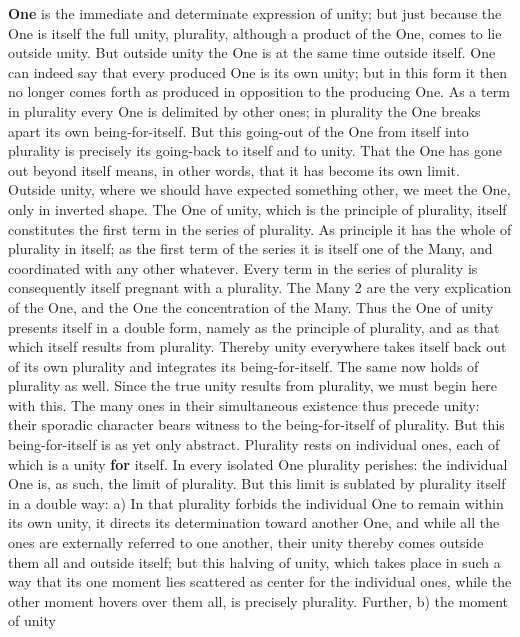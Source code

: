 \documentclass[12pt,a4paper,openany]{book}
\newcommand{\opage}[1]{\marginnote{\footnotesize\textit{[#1]}}}
\begin{document}
\textbf{One} is the immediate and determinate expression of unity;
but just because the One is itself the full unity,
plurality, although a product of the One, comes to lie outside
unity. But outside unity the One is at the same time
outside itself. One can indeed say that every produced
One is its own unity; but in this form
it then no longer comes forth as produced in opposition
to the producing One. As a term in plurality
every One is delimited by other ones; in
plurality the One breaks apart its own being-for-itself.
But this going-out of the One from itself into plurality
is precisely its going-back to itself and to unity. That the One has gone out beyond itself means, in other
words, that it has become its own limit.
Outside unity, where we should have expected something
other, we meet the One, only in inverted shape. The One
of unity, which is the principle of plurality, itself constitutes
the first term in the series of plurality. As principle
it has the whole of plurality in itself; as the first term of the series
it is itself one of the Many, and coordinated with any other
whatever. Every term in the series of plurality
is consequently itself pregnant with a plurality. The Many
\setcounter{footnote}{0}%
\opage{18}2 are the very explication of the One, and the One the concentration
of the Many. Thus the One of unity presents itself
in a double form, namely as the principle of plurality,
and as that which itself results from plurality. Thereby
unity everywhere takes itself back out of its own
plurality and integrates its being-for-itself. The same now holds of plurality as well. Since
the true unity results from plurality, we must
begin here with this. The many ones in their simultaneous existence thus precede unity: their
sporadic character bears witness to the being-for-itself of plurality. But this being-for-itself is as yet only
abstract. Plurality rests on individual ones,
each of which is a unity \textbf{for} itself. In every isolated
One plurality perishes: the individual One is, as
such, the limit of plurality. But this limit
is sublated by plurality itself in a double way: a) In that
plurality forbids the individual One to remain within
its own unity, it directs its determination
toward another One, and while all the ones are externally
referred to one another, their unity thereby comes outside
them all and outside itself; but this halving
of unity, which takes place in such a way that its one moment lies
scattered as center for the individual ones,
while the other moment hovers over them all, is
precisely plurality. Further, b) the moment of unity
\end{document}
